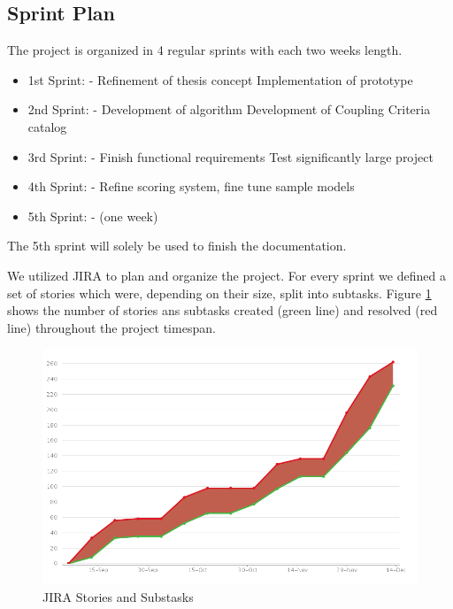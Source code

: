 \subsection{Sprint Plan}
\label{sec:projplan}

The project is organized in 4 regular sprints with each two weeks length. 

\begin{itemize}
\item 1st Sprint:  - 
\subitem Refinement of thesis concept
\subitem Implementation of prototype
\item 2nd Sprint:  - 
\subitem Development of algorithm
\subitem Development of Coupling Criteria catalog
\item 3rd Sprint:  - 
\subitem Finish functional requirements
\subitem Test significantly large project
\item 4th Sprint:  - 
\subitem Refine scoring system, fine tune sample models
\item 5th Sprint:  -  (one week)
\end{itemize}

The 5th sprint will solely be used to finish the documentation.

We utilized JIRA\cite{jira} to plan and organize the project. For every sprint we defined a set of stories which were, depending on their size, split into subtasks. Figure \ref{fig:jira} shows the number of stories ans subtasks created (green line) and resolved (red line) throughout the project timespan.

\begin{figure}[H]
	\includegraphics[scale=0.7]{images/jira.png}
	\caption{JIRA Stories and Substasks}
	\label{fig:jira}
\end{figure}

